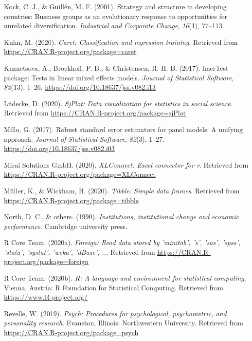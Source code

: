 \documentclass[
  english,
  man]{apa6}
\begin{document}
\leavevmode\hypertarget{ref-kock2001strategy}{}%
Kock, C. J., \& Guillén, M. F. (2001). Strategy and structure in developing countries: Business groups as an evolutionary response to opportunities for unrelated diversification. \emph{Industrial and Corporate Change}, \emph{10}(1), 77--113.

\leavevmode\hypertarget{ref-R-caret}{}%
Kuhn, M. (2020). \emph{Caret: Classification and regression training}. Retrieved from \url{https://CRAN.R-project.org/package=caret}

\leavevmode\hypertarget{ref-R-lmerTest}{}%
Kuznetsova, A., Brockhoff, P. B., \& Christensen, R. H. B. (2017). lmerTest package: Tests in linear mixed effects models. \emph{Journal of Statistical Software}, \emph{82}(13), 1--26. \url{https://doi.org/10.18637/jss.v082.i13}

\leavevmode\hypertarget{ref-R-sjPlot}{}%
Lüdecke, D. (2020). \emph{SjPlot: Data visualization for statistics in social science}. Retrieved from \url{https://CRAN.R-project.org/package=sjPlot}

\leavevmode\hypertarget{ref-R-plm_b}{}%
Millo, G. (2017). Robust standard error estimators for panel models: A unifying approach. \emph{Journal of Statistical Software}, \emph{82}(3), 1--27. \url{https://doi.org/10.18637/jss.v082.i03}

\leavevmode\hypertarget{ref-R-XLConnect}{}%
Mirai Solutions GmbH. (2020). \emph{XLConnect: Excel connector for r}. Retrieved from \url{https://CRAN.R-project.org/package=XLConnect}

\leavevmode\hypertarget{ref-R-tibble}{}%
Müller, K., \& Wickham, H. (2020). \emph{Tibble: Simple data frames}. Retrieved from \url{https://CRAN.R-project.org/package=tibble}

\leavevmode\hypertarget{ref-north1990institutions}{}%
North, D. C., \& others. (1990). \emph{Institutions, institutional change and economic performance}. Cambridge university press.

\leavevmode\hypertarget{ref-R-foreign}{}%
R Core Team. (2020a). \emph{Foreign: Read data stored by 'minitab', 's', 'sas', 'spss', 'stata', 'systat', 'weka', 'dBase', ...} Retrieved from \url{https://CRAN.R-project.org/package=foreign}

\leavevmode\hypertarget{ref-R-base}{}%
R Core Team. (2020b). \emph{R: A language and environment for statistical computing}. Vienna, Austria: R Foundation for Statistical Computing. Retrieved from \url{https://www.R-project.org/}

\leavevmode\hypertarget{ref-R-psych}{}%
Revelle, W. (2019). \emph{Psych: Procedures for psychological, psychometric, and personality research}. Evanston, Illinois: Northwestern University. Retrieved from \url{https://CRAN.R-project.org/package=psych}
\end{document}

